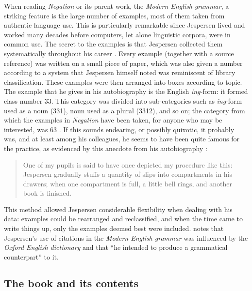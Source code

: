 \documentclass[output=chapter]{langscibook}
\begin{document}
When reading \textit{Negation} or its parent work, the \textit{Modern English grammar}, a striking feature is the large number of examples, most of them taken from authentic language use. This is particularly remarkable since Jespersen lived and worked many decades before computers, let alone linguistic corpora, were in common use. The secret to the examples is that Jespersen collected them systematically throughout his career \citep[247--251]{Jespersen1995}. Every example (together with a source reference) was written on a small piece of paper, which was also given a number according to a system that Jespersen himself noted was reminiscent of library classification. These examples were then arranged into boxes according to topic. The example that he gives in his autobiography is the English \textit{ing}-form: it formed class number 33. This category was divided into sub-categories such as \textit{ing}-form used as a noun (331), noun used as a plural (3312), and so on; the category from which the examples in \textit{Negation} have been taken, for anyone who may be %
interested, was 63 \citep[250]{Jespersen1995}. If this sounds endearing, or possibly quixotic, it probably was, and at least among his colleagues, he seems to have been quite famous for the practice, as evidenced by this anecdote from his autobiography \citep[250]{Jespersen1995}:

\begin{quote}
One of my pupils is said to have once depicted my procedure like this: \mbox{Jespersen} gradually stuffs a quantity of slips into compartments in his drawers; when one compartment is full, a little bell rings, and another book is finished.
\end{quote}

This method allowed Jespersen considerable flexibility when dealing with his data: examples could be rearranged and reclassified, and when the time came to write things up, only the examples deemed best were included. \citet[94]{Francis1989} notes that Jespersen’s use of citations in the \textit{Modern English grammar} was influenced by the \textit{Oxford English dictionary} and that ``he intended to produce a grammatical counterpart'' to it.

\subsection{The book and its contents}\largerpage
\end{document}
